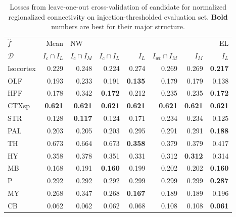 \begin{table}[H]
\begin{tabular}{lrrrrrrr}
\toprule
$\widehat f$ &           Mean & \multicolumn{5}{l}{NW} &     EL \\
$\mathcal D$ & $I_c \cap I_L$ & $I_c \cap I_M$ & $I_c \cap I_L$ &  $I_L$ & $I_{wt} \cap I_M$ &  $I_M$ &  $I_L$ \\
\midrule
Isocortex &          0.229 &          0.248 &          0.224 &  0.274 &             0.269 &  0.269 &  \textbf{0.217} \\
OLF       &          0.193 &          0.233 &          0.191 &   \textbf{0.135} &             0.179 &  0.179 &  0.138 \\
HPF       &          0.178 &          0.342 &          \textbf{ 0.172 }&  0.212 &             0.235 &  0.235 &   \textbf{0.172} \\
CTXsp     &          \textbf{ 0.621 }&      \textbf{     0.621 }&       \textbf{    0.621} &   \textbf{0.621 }&            \textbf{  0.621} &   \textbf{0.621 }&   \textbf{0.621 }\\
STR       &          0.128 &         \textbf{  0.117} &          0.124 &  0.171 &             0.234 &  0.234 &  0.125 \\
PAL       &          0.203 &          0.205 &          0.203 &  0.295 &             0.291 &  0.291 & \textbf{  0.188 }\\
TH        &          0.673 &          0.664 &          0.673 &   \textbf{0.358} &             0.379 &  0.379 &  0.417 \\
HY        &          0.358 &          0.378 &          0.351 &  0.331 &             0.312 &   \textbf{0.312} &  0.314 \\
MB        &          0.168 &          0.191 &         \textbf{ 0.160 }&  0.199 &             0.202 &  0.202 & \textbf{ 0.160} \\
P         &          0.292 &          0.292 &          0.292 &  0.299 &             0.299 &  0.299 &\textbf{  0.287 }\\
MY        &          0.268 &          0.347 &          0.268 &  \textbf{0.167} &             0.189 &  0.189 &  0.196 \\
CB        &          0.062 &          0.062 &          0.062 &  0.068 &             0.108 &  0.108 &  \textbf{0.061 }\\
\bottomrule
\end{tabular}
\caption{Losses from leave-one-out cross-validation of candidate for normalized regionalized connectivity on injection-thresholded evaluation set. \textbf{Bold} numbers are best for their major structure.}
\label{tab:crossvalidation}
\end{table}



